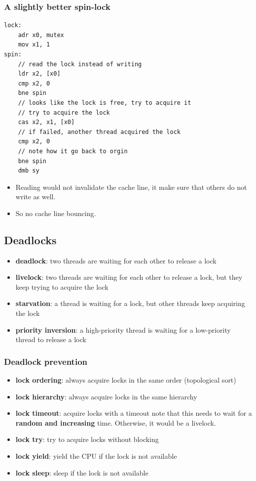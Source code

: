 \documentclass[letterpaper,12pt]{article}
\begin{document}
\subsubsection{A slightly better spin-lock}
\begin{lstlisting}
lock:
    adr x0, mutex
    mov x1, 1
spin:
    // read the lock instead of writing
    ldr x2, [x0]
    cmp x2, 0
    bne spin
    // looks like the lock is free, try to acquire it
    // try to acquire the lock
    cas x2, x1, [x0]
    // if failed, another thread acquired the lock
    cmp x2, 0
    // note how it go back to orgin 
    bne spin
    dmb sy
\end{lstlisting}
\begin{itemize}
    \item Reading would not invalidate the cache line, it make sure that others do not write as well.
    \item So no cache line bouncing.
\end{itemize}
\subsection{Deadlocks}
\begin{itemize}
    \item \textbf{deadlock}: two threads are waiting for each other to release a lock
    \item \textbf{livelock}: two threads are waiting for each other to release a lock, but they keep trying to acquire the lock
    \item \textbf{starvation}: a thread is waiting for a lock, but other threads keep acquiring the lock
    \item \textbf{priority inversion}: a high-priority thread is waiting for a low-priority thread to release a lock
\end{itemize}
\subsubsection{Deadlock prevention}
\begin{itemize}
    \item \textbf{lock ordering}: always acquire locks in the same order (topological sort)
    \item \textbf{lock hierarchy}: always acquire locks in the same hierarchy
    \item \textbf{lock timeout}: acquire locks with a timeout note that this needs to wait for a \textbf{random and increasing} time. Otherwise, it would be a livelock.
    \item \textbf{lock try}: try to acquire locks without blocking
    \item \textbf{lock yield}: yield the CPU if the lock is not available
    \item \textbf{lock sleep}: sleep if the lock is not available
\end{itemize}
\end{document}
